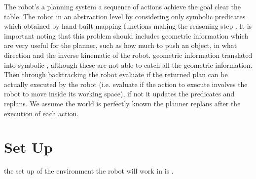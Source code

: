 The robot's  a planning system   a sequence of actions  achieve the goal  clear the table. 
The robot  in an abstraction level by considering only symbolic predicates which  obtained by hand-built mapping functions making  the reasoning step . It is important noting that this problem should includes  geometric information which are very useful for the planner, such as how much to push an object, in what direction and the inverse kinematic of the robot.  geometric information  translated into symbolic , although these are not able to catch all the geometric information. Then through backtracking the robot  evaluate if the returned plan can be actually executed by the robot (i.e. evaluate if the action to execute involves the robot to move inside its working space), if not it updates the predicates and replans. 
We assume the world is perfectly known  the planner replans after the execution of each action.  

\section{Set Up}
 the set up of the environment the robot will work in is . 

